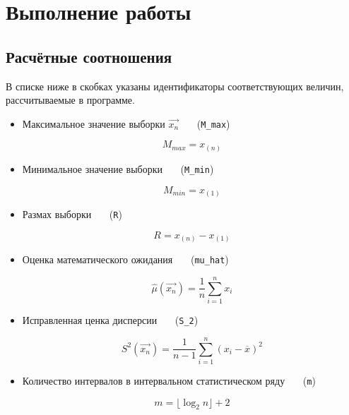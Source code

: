 \chapter{Выполнение работы}

\section{Расчётные соотношения}

В списке ниже в скобках указаны идентификаторы соответствующих величин, рассчитываемые в программе.

\begin{itemize}[$\bullet$]
	\item Максимальное значение выборки $\overrightarrow{x_n}$ ~~~(\texttt{M\_max})

	\begin{equation}
		M_{max} = x_{(n)}
	\end{equation}

	\item Минимальное значение выборки ~~~(\texttt{M\_min})
	
	\begin{equation}
		M_{min} = x_{(1)}
	\end{equation}

	\item Размах выборки ~~~(\texttt{R})
	
	\begin{equation}
		R = x_{(n)} - x_{(1)}
	\end{equation}

	\item Оценка математического ожидания ~~~(\texttt{mu\_hat})
	
	\begin{equation}
		\hat\mu(\overrightarrow{x_n}) = \frac{1}{n} \sum_{i=1}^{n} x_i
	\end{equation}

	\item Исправленная ценка дисперсии ~~~(\texttt{S\_2})
	
	\begin{equation}
		S^2(\overrightarrow{x_n}) = \frac{1}{n-1} \sum_{i=1}^{n} (x_i - \overline{x})^2
	\end{equation}

	\item Количество интервалов в интервальном статистическом ряду ~~~(\texttt{m})
	
	\begin{equation}
		m = \lfloor \log_2 n \rfloor + 2
	\end{equation}

\end{itemize}

